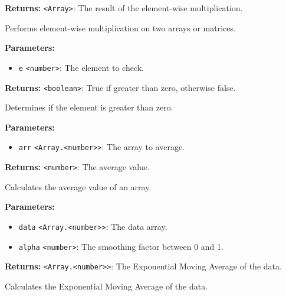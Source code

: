 \documentclass[12pt,a4paper]{article}
\begin{document}
\noindent \textbf{Returns:} \texttt{<Array>}: The result of the element-wise multiplication.

\noindent Performs element-wise multiplication on two arrays or matrices.

\vspace{5mm}
\noindent {}


\noindent \textbf{Parameters:}
\begin{itemize}
  \item \texttt{e} \texttt{<number>}: The element to check.
\end{itemize}

\noindent \textbf{Returns:} \texttt{<boolean>}: True if greater than zero, otherwise false.

\noindent Determines if the element is greater than zero.

\vspace{5mm}
\noindent {}


\noindent \textbf{Parameters:}
\begin{itemize}
  \item \texttt{arr} \texttt{<Array.<number>>}: The array to average.
\end{itemize}

\noindent \textbf{Returns:} \texttt{<number>}: The average value.

\noindent Calculates the average value of an array.

\vspace{5mm}
\noindent {}


\noindent \textbf{Parameters:}
\begin{itemize}
  \item \texttt{data} \texttt{<Array.<number>>}: The data array.
  \item \texttt{alpha} \texttt{<number>}: The smoothing factor between 0 and 1.
\end{itemize}

\noindent \textbf{Returns:} \texttt{<Array.<number>>}: The Exponential Moving Average of the data.

\noindent Calculates the Exponential Moving Average of the data.
\end{document}
